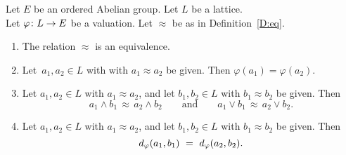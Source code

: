 \documentclass[main.tex]{subfiles}
\begin{document}
\begin{prop}
\label{P:eq}
Let $E$ be an ordered Abelian group.
Let $L$ be a lattice.\\
Let $\varphi\colon L\rightarrow E$ be a valuation.
Let $\approx$ be as in Definition~\ref{D:eq}.
\begin{enumerate}
\item
\label{P:eq-1}
The relation $\approx$ is an equivalence.
\item 
\label{P:eq-2}
Let~$a_1,a_2\in L$ with 
with $a_1\approx a_2$ be given.
Then $\varphi(a_1)=\varphi(a_2)$.
\item
\label{P:eq-3}
Let $a_1,a_2 \in L$ with $a_1\approx a_2$,
and let $b_1,b_2 \in L$ with $b_1 \approx b_2$ be given.
Then
\begin{equation*}
a_1 \wedge b_1 \,\approx\, a_2 \wedge b_2
\qquad\text{and}\qquad 
a_1 \vee b_1 \,\approx\, a_2 \vee b_2.
\end{equation*}
\item
\label{P:eq-4}
Let $a_1,a_2 \in L$ with $a_1\approx a_2$,
and let $b_1,b_2 \in L$ with $b_1 \approx b_2$ be given.
Then
\begin{equation*}
\ld\varphi(a_1,b_1)\ =\ \ld\varphi(a_2,b_2).
\end{equation*}
\end{enumerate}
\end{prop}
\end{document}
